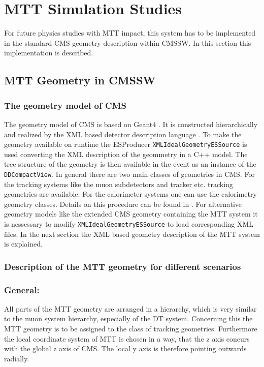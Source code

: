 \section{MTT Simulation Studies}
\label{sec:MTTsimulation}
	For future physics studies with MTT impact, this system has to be implemented in the standard CMS geometry description within CMSSW.
	In this section this implementation is described. 
	\subsection{MTT Geometry in CMSSW}
		\subsubsection{The geometry model of CMS}
			The geometry model of CMS is based on Geant4 \cite{Geant4}.
			It is constructed hierarchically and realized by the XML based detector description language \cite{CMSDDL}.
			To make the geometry available on runtime the ESProducer \verb+XMLIdealGeometryESSource+ is used converting the XML description of the geommetry in a C++ model.
			The tree structure of the geometry is then available in the event as an instance of the \verb+DDCompactView+.
			In general there are two main classes of geometries in CMS.
			For the tracking systems like the muon subdetectors and tracker etc. tracking geometries are available.
			For the calorimeter systems one can use the calorimetry geometry classes.
			Details on this procedure can be found in \cite{CMSDDL}.
			For alternative geometry models like the extended CMS geometry containing the MTT system it is nessessary to modify \verb+XMLIdealGeometryESSource+ to load corresponding XML
			files.
			In the next section the XML based geometry description of the MTT system is explained.
		\subsubsection{Description of the MTT geometry for different scenarios}
			\subsubsection*{General:}
			All parts of the MTT geometry are arranged in a hierarchy, which is very similar to the muon system hierarchy, especially of the DT system.
			Concerning this the MTT geometry is to be assigned to the class of tracking geometries.
			Furthermore the local coordinate system of MTT is chosen in a way, that the z axis concurs with the global z axis of CMS.
			The local y axis is therefore pointing outwards radially.
